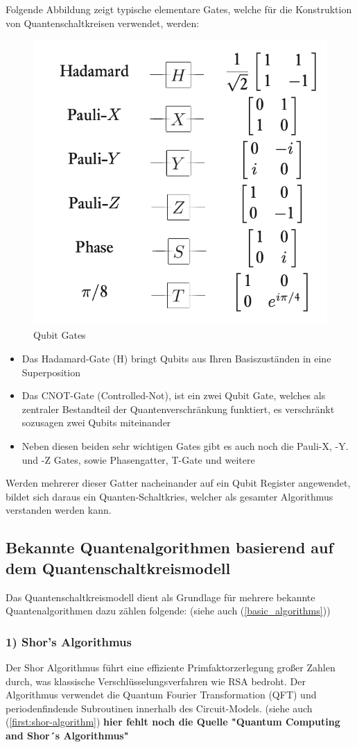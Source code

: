 Folgende Abbildung zeigt typische elementare Gates, welche für die Konstruktion von Quantenschaltkreisen verwendet, werden: 
\begin{figure}
    \centering
    \includegraphics[width=0.5\linewidth]{images/qubit_gates.png}
    \caption{Qubit Gates \autocite[177]{nielsen_quantum_2010}}
    \label{fig:enter-label}
\end{figure}

\begin{itemize}
    \item Das Hadamard-Gate (H) bringt Qubits aus Ihren Basiszuständen in eine Superposition 
    \item Das CNOT-Gate (Controlled-Not), ist ein zwei Qubit Gate, welches als zentraler Bestandteil der Quantenverschränkung funktiert, es verschränkt sozusagen zwei Qubits miteinander 
    \item Neben diesen beiden sehr wichtigen Gates gibt es auch noch die Pauli-X, -Y. und -Z Gates, sowie Phasengatter, T-Gate  und weitere 
\end{itemize}
Werden mehrerer dieser Gatter nacheinander auf ein Qubit Register angewendet, bildet sich daraus ein Quanten-Schaltkries, welcher als gesamter Algorithmus verstanden werden kann.
\autocite[174-188]{nielsen_quantum_2010}
\subsection*{Bekannte Quantenalgorithmen basierend auf dem Quantenschaltkreismodell}
Das Quantenschaltkreismodell dient als Grundlage für mehrere bekannte Quantenalgorithmen dazu zählen folgende: (siehe auch (\autoref{basic_algorithms}))
\subsubsection*{1) Shor's Algorithmus}
Der Shor Algorithmus führt eine effiziente Primfaktorzerlegung großer Zahlen durch, was klassische Verschlüsselungsverfahren wie RSA bedroht. Der Algorithmus verwendet die Quantum Fourier Transformation (QFT) und periodenfindende Subroutinen innerhalb des Circuit-Models. (siehe auch (\autoref{first:shor-algorithm}) \autocite[226-232]{nielsen_quantum_2010} \textbf{hier fehlt noch die Quelle "Quantum Computing  and Shor´s Algorithmus"}
